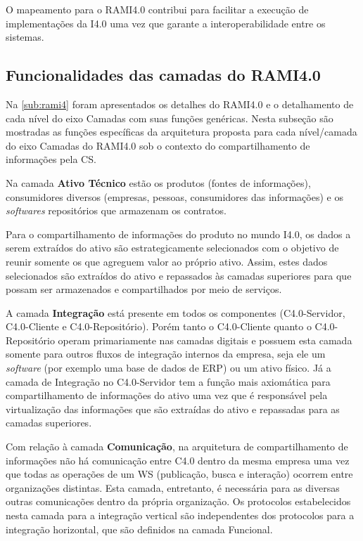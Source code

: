 O mapeamento para o RAMI4.0 contribui para facilitar a execução de implementações da I4.0 uma vez que garante a interoperabilidade entre os sistemas.

\subsection{Funcionalidades das camadas do RAMI4.0}

Na \autoref{sub:rami4} foram apresentados os detalhes do RAMI4.0 e o detalhamento de cada nível do eixo Camadas com suas funções genéricas. Nesta subseção são mostradas as funções específicas da arquitetura proposta para cada nível/camada do eixo Camadas do RAMI4.0 sob o contexto do compartilhamento de informações pela CS.

Na camada \textbf{Ativo Técnico} estão os produtos (fontes de informações), consumidores diversos (empresas, pessoas, consumidores das informações) e os \textit{softwares} repositórios que armazenam os contratos.

Para o compartilhamento de informações do produto no mundo I4.0, os dados a serem extraídos do ativo são estrategicamente selecionados com o objetivo de reunir somente os que agreguem valor ao próprio ativo. Assim, estes dados selecionados são extraídos do ativo e repassados às camadas superiores para que possam ser armazenados e compartilhados por meio de serviços.

A camada \textbf{Integração} está presente em todos os componentes (C4.0-Servidor, C4.0-Cliente e C4.0-Repositório). Porém tanto o C4.0-Cliente quanto o C4.0-Repositório operam primariamente nas camadas digitais e possuem esta camada somente para outros fluxos de integração internos da empresa, seja ele um \textit{software} (por exemplo uma base de dados de ERP) ou um ativo físico. Já a camada de Integração no C4.0-Servidor tem a função mais axiomática para compartilhamento de informações do ativo uma vez que é responsável pela virtualização das informações que são extraídas do ativo e repassadas para as camadas superiores.

Com relação à camada \textbf{Comunicação}, na arquitetura de compartilhamento de informações não há comunicação entre C4.0 dentro da mesma empresa uma vez que todas as operações de um WS (publicação, busca e interação) ocorrem entre organizações distintas. Esta camada, entretanto, é necessária para as diversas outras comunicações dentro da própria organização. Os protocolos estabelecidos nesta camada para a integração vertical são independentes dos protocolos para a integração horizontal, que são definidos na camada Funcional.

